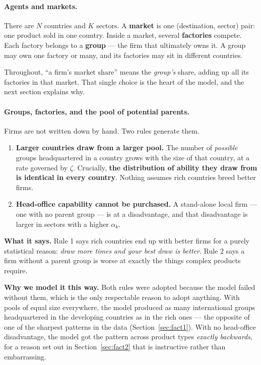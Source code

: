 \documentclass[11pt]{article}
\newcommand{\says}[1]{\smallskip\noindent\textbf{What it says.} #1\smallskip}
\newcommand{\why}[1]{\smallskip\noindent\textbf{Why we model it this way.} #1\smallskip}
\theoremstyle{plain}
\theoremstyle{remark}
\theoremstyle{definition}
\begin{document}
\paragraph{Agents and markets.}

There are $N$ countries and $K$ sectors. A \textbf{market} is one (destination,
sector) pair: one product sold in one country. Inside a market, several
\textbf{factories} compete. Each factory belongs to a \textbf{group} --- the firm that
ultimately owns it. A group may own one factory or many, and its factories may sit in
different countries.

Throughout, ``a firm's market share'' means the \emph{group's} share, adding up all
its factories in that market. That single choice is the heart of the model, and the
next section explains why.

\paragraph{Groups, factories, and the pool of potential parents.}
\label{sec:pool}

Firms are not written down by hand. Two rules generate them.

\begin{enumerate}
\item \textbf{Larger countries draw from a larger pool.} The number of \emph{possible}
groups headquartered in a country grows with the size of that country, at a rate
governed by $\zeta$. Crucially, \textbf{the distribution of ability they draw from is
identical in every country}. Nothing assumes rich countries breed better firms.
\item \textbf{Head-office capability cannot be purchased.} A stand-alone local firm
--- one with no parent group --- is at a disadvantage, and that disadvantage is larger
in sectors with a higher $\alpha_k$.
\end{enumerate}

\says{Rule 1 says rich countries end up with better firms for a purely statistical
reason: \emph{draw more times and your best draw is better}. Rule 2 says a firm
without a parent group is worse at exactly the things complex products require.}

\why{Both rules were adopted because the model failed without them, which is the only
respectable reason to adopt anything. With pools of equal size everywhere, the model
produced as many international groups headquartered in the developing countries as in
the rich ones --- the opposite of one of the sharpest patterns in the data
(Section~\ref{sec:fact1}). With no head-office disadvantage, the model got the pattern
across product types \emph{exactly backwards}, for a reason set out in
Section~\ref{sec:fact2} that is instructive rather than embarrassing.}
\end{document}
